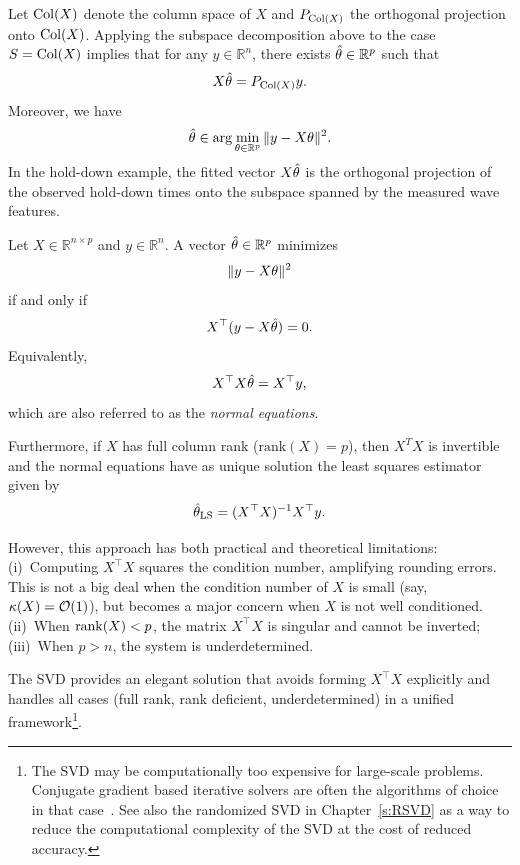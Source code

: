 Let $\operatorname{Col}(X)$ denote the column space of $X$ and
$P_{\operatorname{Col}(X)}$ the orthogonal projection onto $\operatorname{Col}(X)$.
Applying the subspace decomposition above to the case  $S = \operatorname{Col}(X)$ implies that
for any $y \in \mathbb{R}^n$, there exists $\hat {\theta} \in \mathbb{R}^p$ such that
$$
X\hat {\theta} = P_{\operatorname{Col}(X)} y.
$$
Moreover, we have
$$
\hat {\theta} \in \arg\min_{\theta \in \mathbb{R}^p} \|y - X\theta\|^2.
$$
In the hold-down example, the fitted vector $X \hat{\theta}$
is the orthogonal projection of the observed hold-down times onto the subspace spanned by the measured wave features.



Let $X \in \mathbb{R}^{n \times p}$ and $y \in \mathbb{R}^n$. 
A vector $\hat {\theta} \in \mathbb{R}^p$ minimizes
$$\|y - X\theta\|^2$$
if and only if
$$
X^\top (y - X\hat {\theta}) = 0.
$$
Equivalently,
\begin{equation}
\label{eq:normalequations}    
X^\top X \hat {\theta} = X^\top y,
\end{equation}
which are also referred to as the {\em normal equations}.



Furthermore, if $X$ has full column rank ($\mathrm{rank}(X)=p$), then $X^T X$ is invertible and the normal equations have as unique solution
the least squares estimator given by 
\begin{equation}\label{eq:ols_standard}
  \hat{\theta}_{\text{LS}} = (X^\top X)^{-1}X^\top y.
\end{equation}




However, this approach has both practical and theoretical limitations: (i)~Computing $X^\top X$ squares the condition 
number, amplifying rounding errors. This is not a big deal when the condition number of $X$ is small (say, $\kappa(X) = \mathcal{O}(1)$), but becomes a major concern when $X$ is not well conditioned. (ii)~When $\operatorname{rank}(X) < p$, the matrix $X^\top X$ is singular and cannot be inverted; (iii)~When $p > n$, the system is underdetermined.


The SVD provides an elegant solution that avoids forming 
$X^\top X$ explicitly and handles all cases (full rank, rank deficient, underdetermined) in a unified framework\footnote{The SVD may be computationally too expensive for large-scale problems. Conjugate gradient based iterative solvers are often the algorithms of choice in that case~\cite{Golub_MatrixComputations,hanke2017conjugate}. See also the randomized SVD in Chapter~\ref{s:RSVD} as a way to reduce the computational complexity of the SVD at the cost of reduced accuracy.}.


